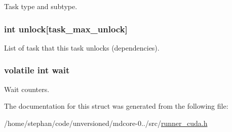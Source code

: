 Task type and subtype. \hypertarget{structtask__cuda_a04f8c77b785d7085535af360c3b3604f}{
\subsubsection[{unlock}]{\setlength{\rightskip}{0pt plus 5cm}int unlock\mbox{[}{\bf task\-\_\-max\-\_\-unlock}\mbox{]}}}\label{structtask__cuda_a04f8c77b785d7085535af360c3b3604f}
List of task that this task unlocks (dependencies). \hypertarget{structtask__cuda_aa94a6aba3d992ae3ac145f984ceb2eb9}{
\subsubsection[{wait}]{\setlength{\rightskip}{0pt plus 5cm}volatile int wait}}\label{structtask__cuda_aa94a6aba3d992ae3ac145f984ceb2eb9}
Wait counters. 

The documentation for this struct was generated from the following file\-:\begin{DoxyCompactItemize}
\item 
/home/stephan/code/unversioned/mdcore-\/0../src/\hyperlink{runner__cuda_8h}{runner\-\_\-cuda.\-h}\end{DoxyCompactItemize}

